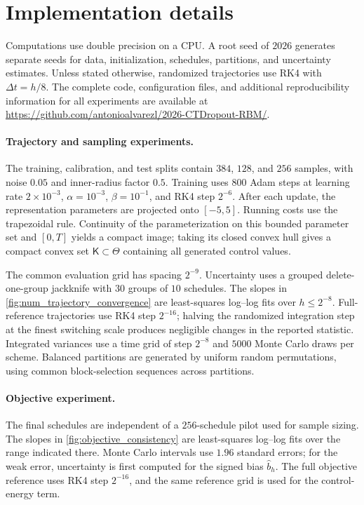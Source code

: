 \documentclass[twoside,11pt]{article}
\theoremstyle{plain}
\begin{document}
\section{Implementation details}\label{sec:numerical_details}

Computations use double precision on a CPU. A root seed of $2026$ generates
separate seeds for data, initialization, schedules, partitions, and uncertainty
estimates. Unless stated otherwise, randomized trajectories use RK4 with
$\Delta t=h/8$. The complete code, configuration files, and additional
reproducibility information for all experiments are available at
\url{https://github.com/antonioalvarezl/2026-CTDropout-RBM/}.


\paragraph{Trajectory and sampling experiments.}


The training, calibration, and test splits contain $384$, $128$, and $256$ samples, with noise $0.05$ and inner-radius factor $0.5$. Training uses $800$ Adam steps at learning rate $2\times10^{-3}$, $\alpha=10^{-3}$, $\beta=10^{-1}$, and RK4 step $2^{-6}$. After each update, the representation parameters are projected onto $[-5,5]$. Running costs use the trapezoidal rule. Continuity of the parameterization on this bounded parameter set and $[0,T]$ yields a compact image; taking its closed convex hull gives a compact convex set $\mathsf K\subset\Theta$ containing all generated control values.


The common evaluation grid has spacing $2^{-9}$. Uncertainty uses a grouped
delete-one-group jackknife with $30$ groups of $10$ schedules. The slopes in
\cref{fig:num_trajectory_convergence} are least-squares log--log fits over
$h\le2^{-8}$. Full-reference trajectories use RK4 step $2^{-16}$; halving the
randomized integration step at the finest switching scale produces negligible
changes in the reported statistic. Integrated variances use a time grid of
step $2^{-8}$ and $5000$ Monte Carlo draws per scheme. Balanced partitions are
generated by uniform random permutations, using common block-selection
sequences across partitions.

\paragraph{Objective experiment.}
The final schedules are independent of a $256$-schedule pilot used for sample
sizing. The slopes in \cref{fig:objective_consistency} are least-squares
log--log fits over the range indicated there. Monte Carlo intervals use
$1.96$ standard errors; for the weak error, uncertainty is first computed for
the signed bias $\hat b_h$. The full objective reference uses RK4 step
$2^{-16}$, and the same reference grid is used for the control-energy term.
\end{document}
